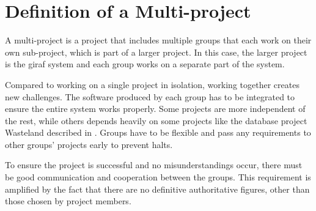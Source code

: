 \section{Definition of a Multi-project}
\label{sec:multiproject}
A multi-project is a project that includes multiple groups that each work on their own sub-project, which is part of a larger project. In this case, the larger project is the \ac{giraf} system and each group works on a separate part of the system.

Compared to working on a single project in isolation, working together creates new challenges. The software produced by each group has to be integrated to ensure the entire system works properly. Some projects are more independent of the rest, while others depends heavily on some projects like the database project Wasteland described in . Groups have to be flexible and pass any requirements to other groups' projects early to prevent halts.

To ensure the project is successful and no misunderstandings occur, there must be good communication and cooperation between the groups. This requirement is amplified by the fact that there are no definitive authoritative figures, other than those chosen by project members.
